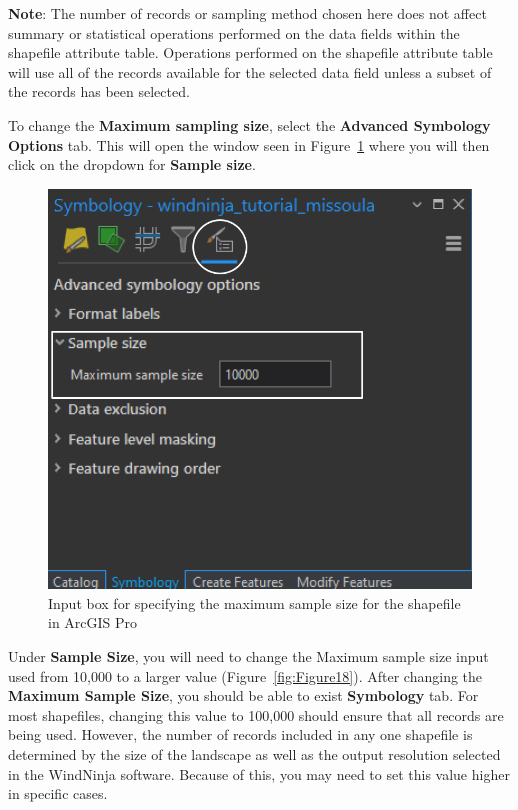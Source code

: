 \documentclass[12pt]{article}
\begin{document}
\textbf{Note}: The number of records or sampling method chosen here does not affect summary or statistical operations performed on the data fields within the shapefile attribute table. Operations performed on the shapefile attribute table will use all of the records available for the selected data field unless a subset of the records has been selected. 

To change the \textbf{Maximum sampling size}, select the \textbf{Advanced Symbology Options} tab. This will open the window seen in Figure~\ref{fig:Figure19} where you will then click on the dropdown for \textbf{Sample size}. 

\begin{figure}[H]
	\centering
	\includegraphics[scale=0.45]{arc_19.png}
	\caption{Input box for specifying the maximum sample size for the shapefile in ArcGIS Pro}
\label{fig:Figure19}
\end{figure}

Under \textbf{Sample Size}, you will need to change the Maximum sample size input used from 10,000 to a larger value (Figure~\ref{fig:Figure18}). After changing the \textbf{Maximum Sample Size}, you should be able to exist \textbf{Symbology} tab. For most shapefiles, changing this value to 100,000 should ensure that all records are being used. However, the number of records included in any one shapefile is determined by the size of the landscape as well as the output resolution selected in the WindNinja software. Because of this, you may need to set this value higher in specific cases.
\end{document}

